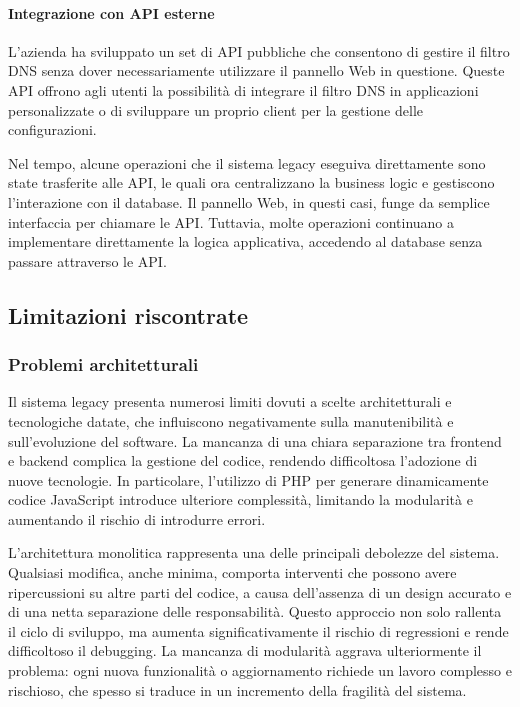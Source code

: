 \paragraph{Integrazione con API esterne}
L'azienda ha sviluppato un set di API pubbliche che consentono di gestire il filtro DNS senza dover necessariamente utilizzare il pannello Web in questione. Queste API offrono agli utenti la possibilità di integrare il filtro DNS in applicazioni personalizzate o di sviluppare un proprio client per la gestione delle configurazioni.

Nel tempo, alcune operazioni che il sistema legacy eseguiva direttamente sono state trasferite alle API, le quali ora centralizzano la business logic e gestiscono l'interazione con il database. Il pannello Web, in questi casi, funge da semplice interfaccia per chiamare le API. Tuttavia, molte operazioni continuano a implementare direttamente la logica applicativa, accedendo al database senza passare attraverso le API.

\subsection{Limitazioni riscontrate}
\subsubsection{Problemi architetturali}
Il sistema legacy presenta numerosi limiti dovuti a scelte architetturali e tecnologiche datate, che influiscono negativamente sulla manutenibilità e sull'evoluzione del software. La mancanza di una chiara separazione tra frontend e backend complica la gestione del codice, rendendo difficoltosa l’adozione di nuove tecnologie. In particolare, l’utilizzo di PHP per generare dinamicamente codice JavaScript introduce ulteriore complessità, limitando la modularità e aumentando il rischio di introdurre errori.

L’architettura monolitica rappresenta una delle principali debolezze del sistema. Qualsiasi modifica, anche minima, comporta interventi che possono avere ripercussioni su altre parti del codice, a causa dell’assenza di un design accurato e di una netta separazione delle responsabilità. Questo approccio non solo rallenta il ciclo di sviluppo, ma aumenta significativamente il rischio di regressioni e rende difficoltoso il debugging. La mancanza di modularità aggrava ulteriormente il problema: ogni nuova funzionalità o aggiornamento richiede un lavoro complesso e rischioso, che spesso si traduce in un incremento della fragilità del sistema.

